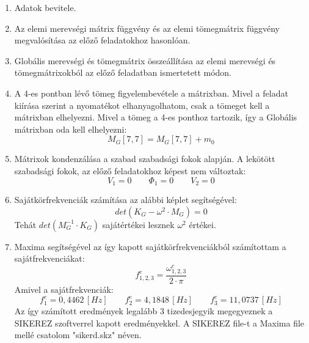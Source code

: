 \documentclass[12pt,a4paper] {article}
\begin{document}
\begin{enumerate}
	\item Adatok bevitele.
	\item Az elemi merevségi mátrix függvény és az elemi tömegmátrix függvény megvalósítása az előző feladatokhoz hasonlóan.
	\item Globális merevségi és tömegmátrix összeállítása az elemi merevségi és tömegmátrixokból az előző feladatban ismertetett módon.
	\item A 4-es pontban lévő tömeg figyelembevétele a mátrixban. Mivel a feladat kiírása szerint a nyomatékot elhanyagolhatom, csak a tömeget kell a mátrixban elhelyezni. Mivel a tömeg a 4-es ponthoz tartozik, így a Globális mátrixban oda kell elhelyezni:
	\[M_G[7,7]=M_G[7,7]+m_0\] 
	\item Mátrixok kondenzálása a szabad szabadsági fokok alapján. A lekötött szabadsági fokok, az előző feladatokhoz képest nem változtak:
	\[V_{1}=0 \qquad \Phi_{1}=0 \qquad V_{2}=0\]
	\newpage
	\item Sajátkörfrekvenciák számítása az alábbi képlet segítségével:
	\[det(K_G-\omega^2 \cdot M_G)=0\]
	Tehát \(det(M_G^{-1} \cdot K_G)\) sajátértékei lesznek $\omega^2$ értékei.
	\item Maxima segítségével az így kapott sajátkörfrekvenciákból számítottam a sajátfrekvenciákat:
	\[f_{1,2,3}^c=\dfrac{\omega_{1,2,3}^c}{2\cdot \pi}\]
	Amivel a sajátfrekvenciák:
	\[f_1^c=0,4462\, [Hz] \qquad f_2^c=4,1848\, [Hz] \qquad f_3^c=11,0737\, [Hz]  \]
	Az így számított eredmények legalább 3 tizedesjegyik megegyeznek a SIKEREZ szoftverrel kapott eredményekkel. A SIKEREZ file-t a Maxima file mellé csatolom "sikerd.skz" néven.
\end{enumerate}\par
\end{document}
